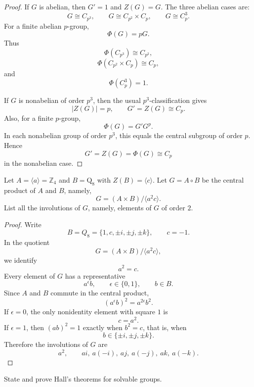 \begin{proof}
If \(G\) is abelian, then \(G'=1\) and \(Z(G)=G\). The three abelian cases are:
\[
    G\cong C_{p^3},
    \qquad
    G\cong C_{p^2}\times C_p,
    \qquad
    G\cong C_p^3.
\]
For a finite abelian \(p\)-group,
\[
    \Phi(G)=pG.
\]
Thus
\[
    \Phi(C_{p^3})\cong C_{p^2},
\]
\[
    \Phi(C_{p^2}\times C_p)\cong C_p,
\]
and
\[
    \Phi(C_p^3)=1.
\]

If \(G\) is nonabelian of order \(p^3\), then the usual \(p^3\)-classification
gives
\[
    |Z(G)|=p,
    \qquad
    G'=Z(G)\cong C_p.
\]
Also, for a finite \(p\)-group,
\[
    \Phi(G)=G'G^p.
\]
In each nonabelian group of order \(p^3\), this equals the central subgroup of
order \(p\). Hence
\[
    G'=Z(G)=\Phi(G)\cong C_p
\]
in the nonabelian case.
\end{proof}

\begin{exercise}
Let \(A = \langle a \rangle = \mathbb{Z}_4\) and \(B = \mathrm{Q}_8\) with
\(Z(B) = \langle c \rangle\). Let \(G = A \circ B\) be the central product of
\(A\) and \(B\), namely,
\[
    G = (A \times B)/\langle a^2 c \rangle.
\]
List all the involutions of \(G\), namely, elements of \(G\) of order \(2\).
\end{exercise}

\begin{proof}
Write
\[
    B=Q_8=\{1,c,\pm i,\pm j,\pm k\},
    \qquad c=-1.
\]
In the quotient
\[
    G=(A\times B)/\langle a^2c\rangle,
\]
we identify
\[
    a^2=c.
\]
Every element of \(G\) has a representative
\[
    a^\epsilon b,
    \qquad
    \epsilon\in\{0,1\},
    \qquad
    b\in B.
\]
Since \(A\) and \(B\) commute in the central product,
\[
    (a^\epsilon b)^2=a^{2\epsilon}b^2.
\]
If \(\epsilon=0\), the only nonidentity element with square \(1\) is
\[
    c=a^2.
\]
If \(\epsilon=1\), then \((ab)^2=1\) exactly when \(b^2=c\), that is, when
\[
    b\in \{\pm i,\pm j,\pm k\}.
\]
Therefore the involutions of \(G\) are
\[
    a^2,
    \qquad
    ai,\ a(-i),\ aj,\ a(-j),\ ak,\ a(-k).
\]
\end{proof}

\begin{exercise}
State and prove Hall's theorems for solvable groups.
\end{exercise}

